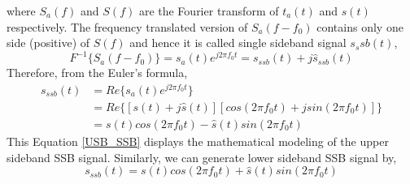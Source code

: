 where ${S_a}(f)$ and ${S}(f)$ are the Fourier transform of ${t_a}(t)$ and ${s}(t)$ respectively. The frequency translated version of ${S_a}(f-f_0)$ contains only one side (positive) of ${S}(f)$ and hence it is called single sideband signal ${s_ssb}(t)$,
\begin{equation}
{F}^{-1}\{S_a(f-f_0)\}={s_a}(t) e^{j2\pi f_0 t}={s_{ssb}}(t)+j{\hat{s}_{ssb}(t)}
\end{equation}
Therefore, from the Euler's formula,
\begin{equation}
\begin{split}
{s}_{ssb}(t)&=Re\{s_a(t)  e^{j2\pi f_0 t}\}\\
&=Re\{[s(t)+j\hat{s}(t)] [cos(2\pi f_0t)+jsin(2\pi f_0t)]\}\\
&=s(t)cos(2\pi f_0t)-\hat{s}(t)sin(2\pi f_0t)
\end{split}
\label{USB_SSB}
\end{equation}
This Equation \ref{USB_SSB} displays the mathematical modeling of the upper sideband SSB signal. Similarly, we can generate lower sideband SSB signal by,
\begin{equation}
{s}_{ssb}(t)=s(t)cos(2\pi f_0t)+\hat{s}(t)sin(2\pi f_0t)
\label{LSB_SSB}
\end{equation}



